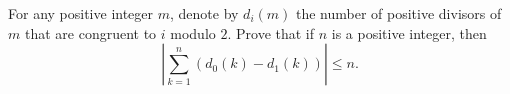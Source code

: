 For any positive integer $m$, denote by $d_i(m)$ the number of positive divisors of $m$ that are congruent to $i$ modulo $2$. Prove that if $n$ is a positive integer, then
\[\left|\sum_{k=1}^n \left(d_0(k)-d_1(k)\right)\right|\le n.\]